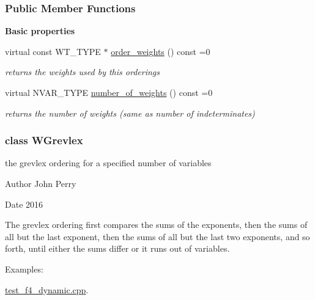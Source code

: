 \subsubsection*{Public Member Functions}
\begin{Indent}\textbf{ Basic properties}\par
\begin{DoxyCompactItemize}
\item 
\mbox{\label{group__orderinggroup_a5916f1631d5c30fe39dedcef96a3944e}} 
virtual const W\+T\+\_\+\+T\+Y\+PE $\ast$ \hyperlink{group__orderinggroup_a5916f1631d5c30fe39dedcef96a3944e}{order\+\_\+weights} () const =0
\begin{DoxyCompactList}\small\item\em returns the weights used by this orderings \end{DoxyCompactList}\item 
\mbox{\label{group__orderinggroup_a7f13d8c571e36bc29d2de39ace88bdd8}} 
virtual N\+V\+A\+R\+\_\+\+T\+Y\+PE \hyperlink{group__orderinggroup_a7f13d8c571e36bc29d2de39ace88bdd8}{number\+\_\+of\+\_\+weights} () const =0
\begin{DoxyCompactList}\small\item\em returns the number of weights (same as number of indeterminates) \end{DoxyCompactList}\end{DoxyCompactItemize}
\end{Indent}
\label{class_w_grevlex}
\subsubsection{class W\+Grevlex}
the grevlex ordering for a specified number of variables 

\begin{DoxyAuthor}{Author}
John Perry 
\end{DoxyAuthor}
\begin{DoxyDate}{Date}
2016
\end{DoxyDate}
The grevlex ordering first compares the sums of the exponents, then the sums of all but the last exponent, then the sums of all but the last two exponents, and so forth, until either the sums differ or it runs out of variables. \begin{Desc}
\item[Examples\+: ]\par
\hyperlink{test_f4_dynamic_8cpp-example}{test\+\_\+f4\+\_\+dynamic.\+cpp}.\end{Desc}


